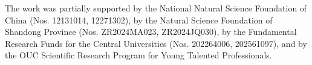 
\begin{acknowledgement} 
The work was partially supported by the National Natural Science Foundation of China (Nos. 12131014, 12271302), by the Natural Science Foundation of Shandong Province (Nos. ZR2024MA023, ZR2024JQ030), by the Fundamental Research Funds for the Central Universities (Nos. 202264006, 202561097), and by the OUC Scientific Research Program for Young Talented Professionals.
\end{acknowledgement}
%
%     




